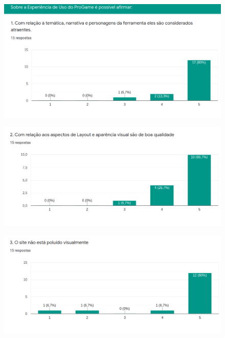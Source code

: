 \begin{apendicesenv}
\begin{figure}[h]
	\centering
	\includegraphics[keepaspectratio=true,scale=0.9]{figuras/1.png}
\end{figure}

\begin{figure}[h]
	\centering
	\includegraphics[keepaspectratio=true,scale=0.9]{figuras/2.png}
\end{figure}

\begin{figure}[h]
	\centering
	\includegraphics[keepaspectratio=true,scale=0.9]{figuras/3.png}
\end{figure}


\end{apendicesenv}
